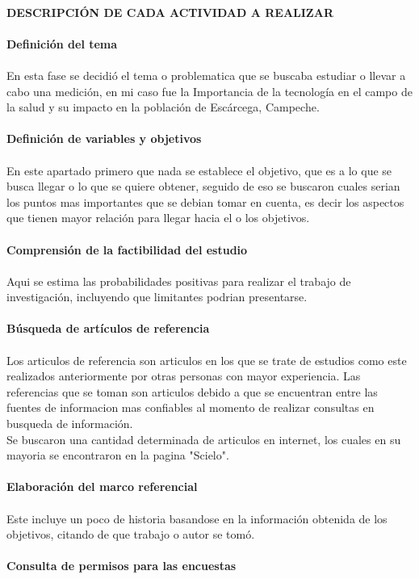 \documentclass [a4paper, 12pt]{report}
\begin{document}
\\
\textbf{DESCRIPCIÓN DE CADA ACTIVIDAD A REALIZAR} \\ 
\\
\textbf{Definición del tema}    \\ 
\\ 
En esta fase se decidió el tema o problematica que se buscaba estudiar o llevar a cabo una medición, en mi caso fue la Importancia de la tecnología en el campo de la salud y su impacto en la población de Escárcega, Campeche. \\
\\ 
\textbf{Definición de variables y objetivos}            \\ 
\\
En este apartado primero que nada se establece el objetivo, que es a lo que se busca llegar o lo que se quiere obtener, seguido de eso se buscaron cuales serian los puntos mas importantes que se debian tomar en cuenta, es decir los aspectos que tienen mayor relación para llegar hacia el o los objetivos. \\
\\
\textbf{Comprensión de la factibilidad del estudio}     \\
\\
Aqui se estima las probabilidades positivas para realizar el trabajo de investigación, incluyendo que limitantes podrian presentarse. \\
\\ 
\textbf{Búsqueda de artículos de referencia}     \\ 
\\
Los articulos de referencia son articulos en los que se trate de estudios como este realizados anteriormente por otras personas con mayor experiencia. Las referencias que se toman son articulos debido a que se encuentran entre las fuentes de informacion mas confiables al momento de realizar consultas en busqueda de información.\\
Se buscaron una cantidad determinada de articulos en internet, los cuales en su mayoria se encontraron en la pagina "Scielo". \\
\\
\textbf{Elaboración del marco referencial}  \\
\\
Este incluye un poco de historia basandose en la información obtenida de los objetivos, citando de que trabajo o autor se tomó.  \\
\\ 
\textbf{Consulta de permisos para las encuestas}       \\ 
\end{document}
